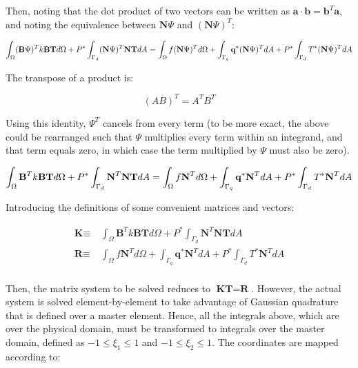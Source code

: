 \documentclass[10pt]{article}
\begin{document}
Then, noting that the dot product of two vectors can be written as \(\textbf{a}\cdot\textbf{b}=\textbf{b}^T\textbf{a}\), and noting the equivalence between \(\textbf{N}\Psi\) and \((\textbf{N}\Psi)^T\):

\begin{equation}
\int_{\Omega}(\textbf{B}\Psi)^Tk\textbf{B}\textbf{T} d\Omega+P^{*}\int_{\Gamma_d}(\textbf{N}\Psi)^T\textbf{N}\textbf{T}dA=\int_{\Omega}f(\textbf{N}\Psi)^T d\Omega+\int_{\Gamma_q}\textbf{q}^{*}(\textbf{N}\Psi)^T dA+P^{*}\int_{\Gamma_d}T^{*}(\textbf{N}\Psi)^T dA\\
\end{equation}

The transpose of a product is:

\begin{equation}
(AB)^T=A^TB^T
\end{equation}

Using this identity, \(\Psi^T\) cancels from every term (to be more exact, the above could be rearranged such that \(\Psi\) multiplies every term within an integrand, and that term equals zero, in which case the term multiplied by \(\Psi\) must also be zero). 

\begin{equation}
\int_{\Omega}\textbf{B}^Tk\textbf{B}\textbf{T} d\Omega+P^{*}\int_{\Gamma_d}\textbf{N}^T\textbf{N}\textbf{T}dA=\int_{\Omega}f\textbf{N}^T d\Omega+\int_{\Gamma_q}\textbf{q}^{*}\textbf{N}^T dA+P^{*}\int_{\Gamma_d}T^{*}\textbf{N}^T dA\\
\end{equation}

Introducing the definitions of some convenient matrices and vectors:

\begin{equation}
\label{eq:TotalDomain}
\begin{aligned}
\textbf{K}\equiv&\ \int_{\Omega}\textbf{B}^Tk\textbf{B}\textbf{T} d\Omega+P^{*}\int_{\Gamma_d}\textbf{N}^T\textbf{N}\textbf{T}dA\\
\textbf{R}\equiv&\ \int_{\Omega}f\textbf{N}^T d\Omega+\int_{\Gamma_q}\textbf{q}^{*}\textbf{N}^T dA+P^{*}\int_{\Gamma_d}T^{*}\textbf{N}^T dA\\
\end{aligned}
\end{equation}

Then, the matrix system to be solved reduces to \(\textbf{K}\textbf{T}=\textbf{R}\). However, the actual system is solved element-by-element to take advantage of Gaussian quadrature that is defined over a master element. Hence, all the integrals above, which are over the physical domain, must be transformed to integrals over the master domain, defined as \(-1\leq\xi_1\leq1\) and \(-1\leq\xi_2\leq1\). The coordinates are mapped according to:
\end{document}
